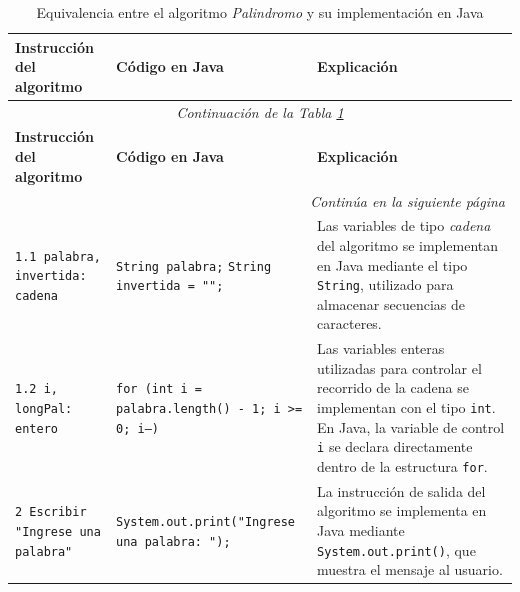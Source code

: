 \documentclass[12pt,twoside]{book}
\begin{document}
					\begin{landscape}
						
						\begin{longtable}{p{6cm} p{6cm} p{7cm}}
							
							\caption{Equivalencia entre el algoritmo \textit{Palindromo} y su implementación en Java}
							\label{tab:palindromoEquivalencia} \\
							
							\toprule
							\textbf{Instrucción del algoritmo} & \textbf{Código en Java} & \textbf{Explicación} \\
							\midrule
							\endfirsthead
							
							\multicolumn{3}{c}{\textit{Continuación de la Tabla \ref{tab:palindromoEquivalencia}}} \\
							\toprule
							\textbf{Instrucción del algoritmo} & \textbf{Código en Java} & \textbf{Explicación} \\
							\midrule
							\endhead
							
							
							\midrule
							\multicolumn{3}{r}{\textit{Continúa en la siguiente página}} \\
							\endfoot
							
							\bottomrule
							\endlastfoot
							
							\texttt{1.1 palabra, invertida: cadena}
							&
							\texttt{String palabra;} \newline
							\texttt{String invertida = "";}
							&
							Las variables de tipo \textit{cadena} del algoritmo se implementan en Java mediante el tipo \texttt{String}, utilizado para almacenar secuencias de caracteres. \\
							
							\texttt{1.2 i, longPal: entero}
							&
							\texttt{for (int i = palabra.length() - 1; i >= 0; i--)}
							&
							Las variables enteras utilizadas para controlar el recorrido de la cadena se implementan con el tipo \texttt{int}. En Java, la variable de control \texttt{i} se declara directamente dentro de la estructura \texttt{for}. \\
							
							
							\texttt{2 Escribir "Ingrese una palabra"}
							&
							\texttt{System.out.print("Ingrese una palabra: ");}
							&
							La instrucción de salida del algoritmo se implementa en Java mediante \texttt{System.out.print()}, que muestra el mensaje al usuario. \\
							

\end{longtable}
\end{landscape}
\end{document}
